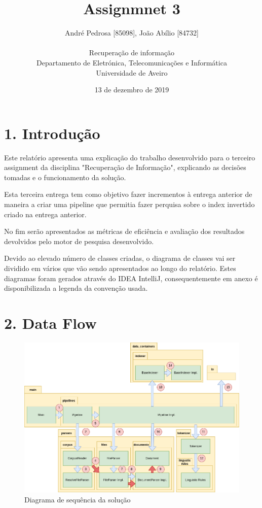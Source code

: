 \documentclass[12pt]{article}
\title{Assignmnet 3}
\author{
    André Pedrosa [85098], João Abílio [84732]\\
    \\
    Recuperação de informação\\
    \normalsize{Departamento de Eletrónica, Telecomunicações e Informática}\\
    \normalsize{Universidade de Aveiro}\\
}
\date{13 de dezembro de 2019}
\begin{document}
\baselineskip18pt

\maketitle

\section*{1. Introdução}
Este relatório apresenta uma explicação do trabalho desenvolvido
para o terceiro assignment da disciplina "Recuperação de Informação",
explicando as decisões tomadas e o funcionamento da solução.

Esta terceira entrega tem como objetivo fazer incrementos à entrega
anterior de maneira a criar uma pipeline que permitia fazer
perquisa sobre o index invertido criado na entrega anterior.

No fim serão apresentados as métricas de eficiência e avaliação dos
resultados devolvidos pelo motor de pesquisa desenvolvido.

Devido ao elevado número de classes criadas, o diagrama de classes
vai ser dividido em vários que vão sendo apresentados ao longo do
relatório. Estes diagramas foram gerados através do IDEA IntelliJ,
consequentemente em anexo é disponibilizada a legenda da convenção
usada.

\section*{2. Data Flow}
\begin{figure}[h]
  \center
  \includegraphics[width=\linewidth]{newsequenceDiagram.png}
  \caption{Diagrama de sequência da solução}
  \label{fig:dataflow}
\end{figure}
\end{document}
